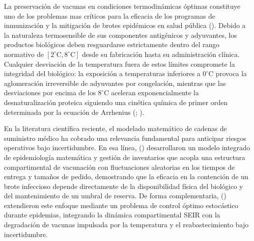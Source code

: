 \documentclass[
  spanish,
  us-letterpaper,
]{scrreprt}
\numberwithin{equation}{section}
\theoremstyle{plain}
\theoremstyle{plain}
\theoremstyle{definition}
\theoremstyle{plain}
\theoremstyle{remark}
\begin{document}
La preservación de vacunas en condiciones termodinámicas óptimas
constituye uno de los problemas mas críticos para la eficacia de los
programas de inmunización y la mitigación de brotes epidémicos en salud
pública (). Debido a la naturaleza termosensible de sus componentes
antigénicos y adyuvantes, los productos biológicos deben resguardarse
estrictamente dentro del rango normativo de
\([2^\circ\text{C}, 8^\circ\text{C}]\) desde su fabricación hasta su
administración clínica. Cualquier desviación de la temperatura fuera de
estos límites compromete la integridad del biológico: la exposición a
temperaturas inferiores a \(0^\circ\text{C}\) provoca la aglomeración
irreversible de adyuvantes por congelación, mientras que las
desviaciones por encima de los \(8^\circ\text{C}\) aceleran
exponencialmente la desnaturalización proteica siguiendo una cinética
química de primer orden determinada por la ecuación de Arrhenius
(;
).

En la literatura científica reciente, el modelado matemático de cadenas
de suministro médico ha cobrado una relevancia fundamental para
anticipar riesgos operativos bajo incertidumbre. En esa línea,
() desarrollaron un modelo integrado de epidemiología
matemática y gestión de inventarios que acopla una estructura
compartimental de vacunación con fluctuaciones aleatorias en los tiempos
de entrega y tamaños de pedido, demostrando que la eficacia en la
contención de un brote infeccioso depende directamente de la
disponibilidad física del biológico y del mantenimiento de un umbral de
reserva. De forma complementaria,
() extendieron este enfoque mediante un problema de control óptimo
estocástico durante epidemias, integrando la dinámica compartimental
SEIR con la degradación de vacunas impulsada por la temperatura y el
reabastecimiento bajo incertidumbre.
\end{document}
